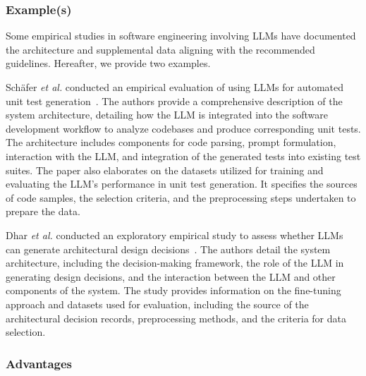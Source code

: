 

\subsubsection{Example(s)}

Some empirical studies in software engineering involving LLMs have documented the architecture and supplemental data aligning with the recommended guidelines. Hereafter, we provide two examples.


Sch{\"{a}}fer \textit{et al.} conducted an empirical evaluation of using LLMs for automated unit test generation~\cite{DBLP:journals/tse/SchaferNET24}. The authors provide a comprehensive description of the system architecture, detailing how the LLM is integrated into the software development workflow to analyze codebases and produce corresponding unit tests. The architecture includes components for code parsing, prompt formulation, interaction with the LLM, and integration of the generated tests into existing test suites. The paper also elaborates on the datasets utilized for training and evaluating the LLM's performance in unit test generation. It specifies the sources of code samples, the selection criteria, and the preprocessing steps undertaken to prepare the data.

Dhar \textit{et al.} conducted an exploratory empirical study to assess whether LLMs can generate architectural design decisions~\cite{DBLP:conf/icsa/DharVV24}. The authors detail the system architecture, including the decision-making framework, the role of the LLM in generating design decisions, and the interaction between the LLM and other components of the system. The study provides information on the fine-tuning approach and datasets used for evaluation, including the source of the architectural decision records, preprocessing methods, and the criteria for data selection. 

\subsubsection{Advantages}

